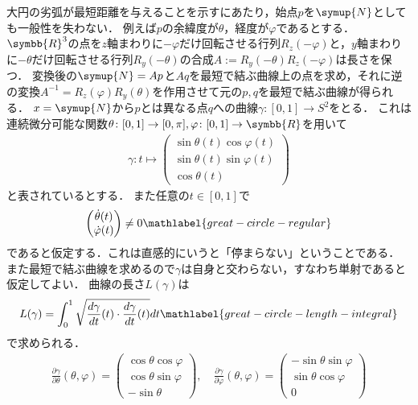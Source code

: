 \documentclass{ltjsbook}
\begin{document}
大円の劣弧が最短距離を与えることを示すにあたり，始点\(p\)を\(\symup{N}\)としても一般性を失わない．
例えば\(p\)の余緯度が\(\theta\)，経度が\(\varphi\)であるとする．
\(\symbb{R}^3\)の点を\(z\)軸まわりに\(-\varphi\)だけ回転させる行列\(R_z(-\varphi)\)と，\(y\)軸まわりに\(-\theta\)だけ回転させる行列\(R_y(-\theta)\)の合成\(A := R_y(-\theta) R_z(-\varphi)\)は長さを保つ．
変換後の\(\symup{N} = Ap\)と\(Aq\)を最短で結ぶ曲線上の点を求め，それに逆の変換\(A^{-1} = R_z(\varphi)R_y(\theta)\)を作用させて元の\(p, q\)を最短で結ぶ曲線が得られる．
\(x = \symup{N}\)から\(p\)とは異なる点\(q\)への曲線\(\gamma \colon [0, 1] \to S^2\)をとる．
これは連続微分可能な関数\(\theta \colon [0, 1] \to [0, \pi], \varphi \colon [0, 1] \to \symbb{R}\)を用いて
\begin{align*}
    \gamma \colon t \mapsto
        \begin{pmatrix}
            \sin \theta(t) \cos \varphi(t) \\
            \sin \theta(t) \sin \varphi(t) \\
            \cos \theta(t)
        \end{pmatrix}
\end{align*}
と表されているとする．
また任意の\(t \in [0, 1]\)で
\begin{align}
    \begin{pmatrix}
        \dot{\theta}(t) \\
        \dot{\varphi}(t)
    \end{pmatrix}
    \neq 0
    \mathlabel{great-circle-regular}
\end{align}
であると仮定する．これは直感的にいうと「停まらない」ということである．
また最短で結ぶ曲線を求めるので\(\gamma\)は自身と交わらない，すなわち単射であると仮定してよい．
曲線の長さ\(L(\gamma)\)は
\begin{align}
    L(\gamma) = \int_{0}^{1} \sqrt{\frac{d\gamma}{dt}(t) \cdot \frac{d\gamma}{dt}(t)} dt
    \mathlabel{great-circle-length-integral}
\end{align}
で求められる．
\begin{align*}
    \frac{\partial \gamma}{\partial \theta}(\theta, \varphi)
    =
    \begin{pmatrix}
        \cos \theta \cos \varphi \\
        \cos \theta \sin \varphi \\
        - \sin \theta
    \end{pmatrix},
    \quad
    \frac{\partial \gamma}{\partial \varphi}(\theta, \varphi)
    =
    \begin{pmatrix}
        - \sin \theta \sin \varphi \\
        \sin \theta \cos \varphi \\
        0
    \end{pmatrix}
\end{align*}
\end{document}
